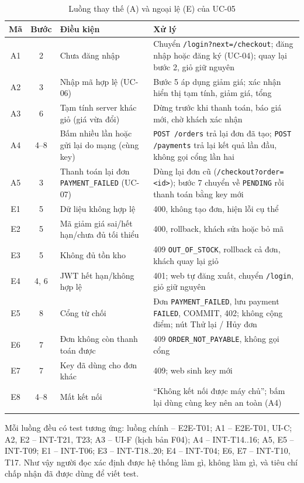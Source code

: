 \documentclass[a4paper]{article}
\newcommand{\st}[1]{\texttt{#1}}
\begin{document}
\begin{longtable}{|c|c|L{4cm}|L{8.6cm}|}
\hline
\textbf{Mã} & \textbf{Bước} & \textbf{Điều kiện} & \textbf{Xử lý} \\ \hline
\endhead
A1 & 2 & Chưa đăng nhập & Chuyển \st{/login?next=/checkout}; đăng nhập hoặc đăng ký (UC-04); quay lại bước 2, giỏ giữ nguyên \\ \hline
A2 & 3 & Nhập mã hợp lệ (UC-06) & Bước 5 áp dụng giảm giá; xác nhận hiển thị tạm tính, giảm giá, tổng \\ \hline
A3 & 6 & Tạm tính server khác giỏ (giá vừa đổi) & Dừng trước khi thanh toán, báo giá mới, chờ khách xác nhận \\ \hline
A4 & 4--8 & Bấm nhiều lần hoặc gửi lại do mạng (cùng key) & \st{POST /orders} trả lại đơn đã tạo; \st{POST /payments} trả lại kết quả lần đầu, không gọi cổng lần hai \\ \hline
A5 & 3 & Thanh toán lại đơn \st{PAYMENT\_FAILED} (UC-07) & Dùng lại đơn cũ (\st{/checkout?order=<id>}); bước 7 chuyển về \st{PENDING} rồi thanh toán bằng key mới \\ \hline
E1 & 5 & Dữ liệu không hợp lệ & 400, không tạo đơn, hiện lỗi cụ thể \\ \hline
E2 & 5 & Mã giảm giá sai/hết hạn/chưa đủ tối thiểu & 400, rollback, khách sửa hoặc bỏ mã \\ \hline
E3 & 5 & Không đủ tồn kho & 409 \st{OUT\_OF\_STOCK}, rollback cả đơn, khách quay lại giỏ \\ \hline
E4 & 4, 6 & JWT hết hạn/không hợp lệ & 401; web tự đăng xuất, chuyển \st{/login}, giỏ giữ nguyên \\ \hline
E5 & 8 & Cổng từ chối & Đơn \st{PAYMENT\_FAILED}, lưu payment \st{FAILED}, COMMIT, 402; không cộng điểm; nút Thử lại / Hủy đơn \\ \hline
E6 & 7 & Đơn không còn thanh toán được & 409 \st{ORDER\_NOT\_PAYABLE}, không gọi cổng \\ \hline
E7 & 7 & Key đã dùng cho đơn khác & 409; web sinh key mới \\ \hline
E8 & 4--8 & Mất kết nối & ``Không kết nối được máy chủ''; bấm lại dùng cùng key nên an toàn (A4) \\ \hline
\caption{Luồng thay thế (A) và ngoại lệ (E) của UC-05}
\end{longtable}

Mỗi luồng đều có test tương ứng: luồng chính -- E2E-T01; A1 -- E2E-T01, UI-C; A2, E2 -- INT-T21, T23; A3 -- UI-F (kịch bản F04); A4 -- INT-T14..16; A5, E5 -- INT-T09; E1 -- INT-T06; E3 -- INT-T18..20; E4 -- INT-T04; E6, E7 -- INT-T10, T17. Như vậy người đọc xác định được hệ thống làm gì, không làm gì, và tiêu chí chấp nhận đã được dùng để viết test.
\end{document}
